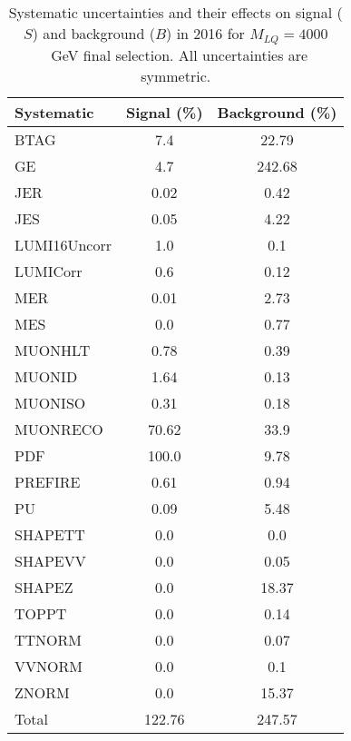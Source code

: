 \begin{table}[htbp]
\begin{center}
\caption{Systematic uncertainties and their effects on signal ($S$) and background ($B$) in 2016 for $M_{LQ}=4000$~GeV final selection. All uncertainties are symmetric.}
\begin{tabular}{lcc}
\hline\hline
Systematic & Signal (\%) & Background (\%) \\ \hline 
BTAG & 7.4 & 22.79\\ 
GE & 4.7 & 242.68\\ 
JER & 0.02 & 0.42\\ 
JES & 0.05 & 4.22\\ 
LUMI16Uncorr & 1.0 & 0.1\\ 
LUMICorr & 0.6 & 0.12\\ 
MER & 0.01 & 2.73\\ 
MES & 0.0 & 0.77\\ 
MUONHLT & 0.78 & 0.39\\ 
MUONID & 1.64 & 0.13\\ 
MUONISO & 0.31 & 0.18\\ 
MUONRECO & 70.62 & 33.9\\ 
PDF & 100.0 & 9.78\\ 
PREFIRE & 0.61 & 0.94\\ 
PU & 0.09 & 5.48\\ 
SHAPETT & 0.0 & 0.0\\ 
SHAPEVV & 0.0 & 0.05\\ 
SHAPEZ & 0.0 & 18.37\\ 
TOPPT & 0.0 & 0.14\\ 
TTNORM & 0.0 & 0.07\\ 
VVNORM & 0.0 & 0.1\\ 
ZNORM & 0.0 & 15.37\\ 
Total & 122.76 & 247.57\\ \hline \hline
\end{tabular}
\label{tab:SysUncertainties_uujj_4000}
\end{center}
\end{table}

